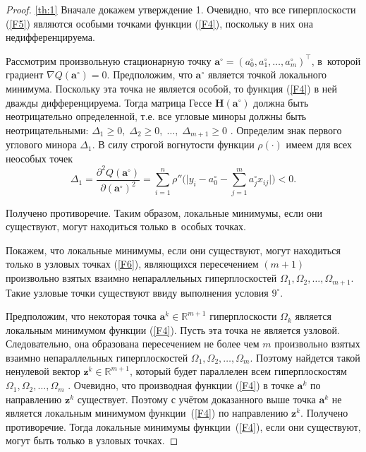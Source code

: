 \begin{proof}{\ref{th:1}}
Вначале докажем утверждение 1. Очевидно, что все гиперплоскости
(\ref{F5}) являются особыми точками функции (\ref{F4}),
поскольку в них она недифференцируема.

Рассмотрим произвольную стационарную точку $\mathbf{a}^{\circ} = (a_{0}^{\circ}, a_{1}^{\circ}, \ldots , a_{m}^{\circ})^{\top}$, в~которой градиент $\nabla Q(\mathbf{a}^{\circ})=0$. 
Предположим, что $\mathbf{a}^{\circ}$ является точкой локального минимума.
Поскольку эта точка не является особой, то функция (\ref{F4}) в
ней дважды дифференцируема. Тогда матрица Гессе
$\mathbf{H}(\mathbf{a}^{\circ})$ должна быть неотрицательно
определенной, т.е. все угловые миноры должны быть
неотрицательными: $\Delta_{1} \geq 0, \; \Delta_{2} \geq 0, \;
\ldots, \; \Delta_{m+1} \geq 0$ {\cite{ninth}}. Определим знак
первого углового минора $\Delta_{1}$. В силу строгой вогнутости
функции $\rho(\cdot)$ имеем для всех неособых точек 
$$
\Delta_{1} =
\dfrac{\partial^{2}Q(\mathbf{a}^{\circ})}{\partial(\mathbf{a}^{\circ})^{2}}=\sum_{i=1}^n
\rho''\biggl(\biggl |y_{i}-a_{0}^{\circ}-\sum_{j=1}^m
a_{j}^{\circ}x_{ij}\biggr|\biggr) < 0.
$$

Получено противоречие.
Таким образом, локальные минимумы, если они существуют, могут находиться только в~особых точках.

Покажем, что локальные минимумы, если они существуют, могут
находиться только в узловых точках (\ref{F6}), являющихся
пересечением $(m + 1)$ произвольно взятых взаимно непараллельных
гиперплоскостей $\Omega_{1}, \Omega_{2},  \ldots,\Omega_{m+1}$. Такие
узловые точки существуют ввиду выполнения условия $9^{\circ}$.

Предположим, что некоторая точка $\mathbf{a}^{k} \in
\mathbb{R}^{m+1}$ гиперплоскости $\Omega_{k}$ является локальным
минимумом функции (\ref{F4}). Пусть эта точка не является
узловой. Следовательно, она образована пересечением не более чем
$m$ произвольно взятых взаимно непараллельных гиперплоскостей
$\Omega_{1}, \Omega_{2}, \ldots,\Omega_{m}$. Поэтому найдется такой
ненулевой вектор $\mathbf{z}^{k} \in \mathbb{R}^{m+1}$, который
будет параллелен всем гиперплоскостям
$\Omega_{1}, \Omega_{2}, \ldots,\Omega_{m}$ {\cite{tenth}}.
Очевидно, что производная функции (\ref{F4}) в точке
$\mathbf{a}^{k}$ по направлению $\mathbf{z}^{k}$ существует.
Поэтому с учётом доказанного выше точка $\mathbf{a}^{k}$ не
является локальным минимумом функции~(\ref{F4}) по направлению
$\mathbf{z}^{k}$. Получено противоречие. Тогда локальные
минимумы функции~(\ref{F4}), если они существуют, могут быть
только в узловых точках.


\end{proof}
